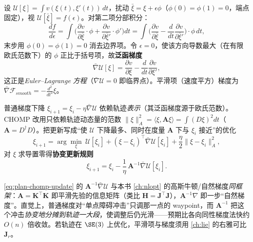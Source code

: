 \begin{derivation}\label{der:plan-chomp}
设 $\mathcal{U}[\xi]=\int v(\xi(t),\xi'(t))\,dt$，扰动 $\bar\xi=\xi+\epsilon\phi$（$\phi(0)=\phi(1)=0$，端点固定），视 $\mathcal{U}[\bar\xi]=f(\epsilon)$。对第二项分部积分：
\[
  \frac{df}{d\epsilon}=\int\Big(\frac{\partial v}{\partial\bar\xi}\cdot\phi+\frac{\partial v}{\partial\bar\xi'}\cdot\phi'\Big)dt
  =\int\Big(\frac{\partial v}{\partial\bar\xi}-\frac{d}{dt}\frac{\partial v}{\partial\bar\xi'}\Big)\cdot\phi\,dt,
\]
末步用 $\phi(0)=\phi(1)=0$ 消去边界项。令 $\epsilon=0$，使该方向导数最大（在有限欧氏范数下）的 $\phi$ 正比于括号项，故\textbf{泛函梯度}
\begin{equation}
  \bar\nabla\mathcal{U}[\xi]=\frac{\partial v}{\partial\xi}-\frac{d}{dt}\frac{\partial v}{\partial\xi'},
  \label{eq:plan-funcgrad}
\end{equation}
这正是\emph{Euler--Lagrange 方程}（$\bar\nabla\mathcal{U}=0$ 即临界点）。平滑项（速度平方）梯度为 $\bar\nabla\mathcal{F}_{smooth}=-\tfrac{d^2}{dt^2}\xi$。
\end{derivation}

\begin{theorem}\label{thm:plan-chomp-update}
普通梯度下降 $\xi_{i+1}=\xi_i-\eta\bar\nabla\mathcal{U}$ 依赖轨迹\emph{表示}（其泛函梯度源于欧氏范数）。CHOMP 改用只依赖轨迹动态量的范数 $\|\xi\|_A^2=\langle\xi,\mathbf{A}\xi\rangle=\int(D\xi)^2dt$（$\mathbf{A}=D^\dagger D$）。把更新写成“使 $\mathcal{U}$ 下降最多、同时在度量 $\mathbf{A}$ 下与 $\xi_i$ 接近”的优化
\[
  \xi_{i+1}=\arg\min_\xi\ \mathcal{U}[\xi_i]+(\xi-\xi_i)^\top\bar\nabla\mathcal{U}[\xi_i]+\frac\eta2\|\xi-\xi_i\|_A^2,
\]
对 $\xi$ 求导置零得\textbf{协变更新规则}
\begin{equation}
  \xi_{i+1}=\xi_i-\frac1\eta\,\mathbf{A}^{-1}\bar\nabla\mathcal{U}[\xi_i].
  \label{eq:plan-chomp-update}
\end{equation}
\end{theorem}

\begin{insight}
\cref{eq:plan-chomp-update} 的 $\mathbf{A}^{-1}\bar\nabla\mathcal{U}$ 与本书 \cref{ch:nlopt} 的高斯牛顿/自然梯度\emph{同框架}：$\mathbf{A}=\mathbf{K}^\top\mathbf{K}$ 即平滑先验的信息矩阵（类比 $\mathbf{H}=\mathbf{J}^\top\mathbf{J}$），$\mathbf{A}^{-1}\nabla$ 即一步“自然梯度”。直觉上，普通梯度对“单点障碍冲击”只调那一点的 waypoint，而 $\mathbf{A}^{-1}$ 把这个冲击\emph{协变地分摊到轨迹一大段}，使调整后仍光滑——预期比各向同性梯度法快约 $O(n)$ 倍收敛。若轨迹在 $\SE(3)$ 上优化，平滑项与梯度须用 \cref{ch:lie} 的右雅可比 $\mathbf{J}_r$。
\end{insight}

